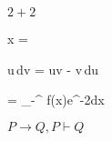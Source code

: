 $2+2$

\displaystyle x = \ 

\int u\,dv = uv - \int v\,du

 = \int_{-\infty}^{\infty} f(x)e^{-2}dx

$P \rightarrow Q , P \vdash Q$

